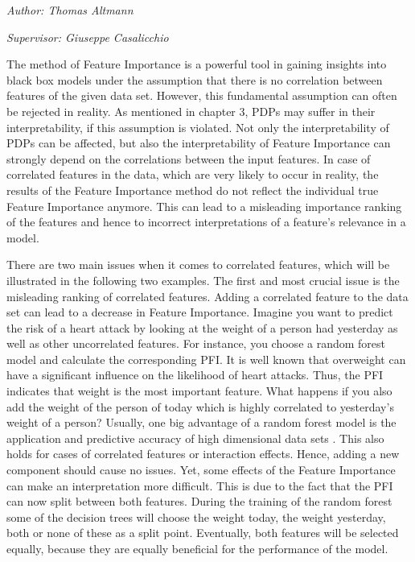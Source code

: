 \documentclass[]{krantz}
\begin{document}
\emph{Author: Thomas Altmann}

\emph{Supervisor: Giuseppe Casalicchio}

The method of Feature Importance is a powerful tool in gaining insights
into black box models under the assumption that there is no correlation
between features of the given data set. However, this fundamental
assumption can often be rejected in reality. As mentioned in chapter 3,
PDPs may suffer in their interpretability, if this assumption is
violated. Not only the interpretability of PDPs can be affected, but
also the interpretability of Feature Importance can strongly depend on
the correlations between the input features. In case of correlated
features in the data, which are very likely to occur in reality, the
results of the Feature Importance method do not reflect the individual
true Feature Importance anymore. This can lead to a misleading
importance ranking of the features and hence to incorrect
interpretations of a feature's relevance in a model.

There are two main issues when it comes to correlated features, which
will be illustrated in the following two examples. The first and most
crucial issue is the misleading ranking of correlated features. Adding a
correlated feature to the data set can lead to a decrease in Feature
Importance. Imagine you want to predict the risk of a heart attack by
looking at the weight of a person had yesterday as well as other
uncorrelated features. For instance, you choose a random forest model
and calculate the corresponding PFI. It is well known that overweight
can have a significant influence on the likelihood of heart attacks.
Thus, the PFI indicates that weight is the most important feature. What
happens if you also add the weight of the person of today which is
highly correlated to yesterday's weight of a person? Usually, one big
advantage of a random forest model is the application and predictive
accuracy of high dimensional data sets \citep{strobl2008}. This also
holds for cases of correlated features or interaction effects. Hence,
adding a new component should cause no issues. Yet, some effects of the
Feature Importance can make an interpretation more difficult. This is
due to the fact that the PFI can now split between both features. During
the training of the random forest some of the decision trees will choose
the weight today, the weight yesterday, both or none of these as a split
point. Eventually, both features will be selected equally, because they
are equally beneficial for the performance of the model.
\citep{molnar2019}
\end{document}
